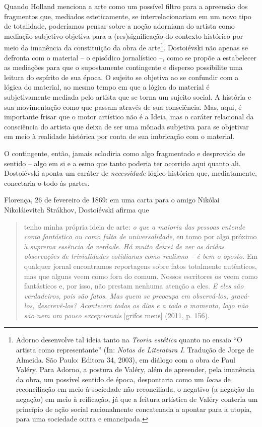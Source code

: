 Quando Holland menciona a arte como um possível filtro para a apreensão
dos fragmentos que, mediados esteticamente, se interrelacionariam em um
novo tipo de totalidade, poderíamos pensar sobre a noção adorniana do
artista como mediação subjetivo-objetiva para a (res)significação do
contexto histórico por meio da imanência da constituição da obra de
arte\footnote{Adorno desenvolve tal ideia tanto na \emph{Teoria
  estética} quanto no ensaio ``O artista como representante'' (In:
  \emph{Notas de Literatura I}. Tradução de Jorge de Almeida. São Paulo:
  Editora 34, 2003), em diálogo com a obra de Paul Valéry. Para Adorno,
  a postura de Valéry, além de apreender, pela imanência da obra, um
  possível sentido de época, despontaria como um \emph{locus} de
  reconciliação em meio à sociedade não reconciliada, o negativo (a
  negação da negação) em meio à reificação, já que a feitura artística
  de Valéry conteria um princípio de ação social racionalmente
  concatenada a apontar para a utopia, para uma sociedade outra e
  emancipada.}. Dostoiévski não apenas se defronta com o material -- o
episódico jornalístico --, como se propõe a estabelecer as mediações
para que o supostamente contingente e disperso possibilite uma leitura
do espírito de sua época. O sujeito se objetiva ao se confundir com a
lógica do material, ao mesmo tempo em que a lógica do material é
subjetivamente mediada pelo artista que se torna um sujeito social. A
história e sua movimentação como que passam através de sua consciência.
Mas, aqui, é importante frisar que o motor artístico não é a Ideia, mas
o caráter relacional da consciência do artista que deixa de ser uma
mônada subjetiva para se objetivar em meio à realidade histórica por
conta de sua imbricação com o material.

O contingente, então, jamais eclodiria como algo fragmentado e
desprovido de sentido -- algo em si e a esmo que tanto poderia ter
ocorrido aqui quanto ali. Dostoiévski aponta um caráter de
\emph{necessidade} lógico-histórica que, mediatamente, conectaria o todo
às partes.

Florença, 26 de fevereiro de 1869: em uma carta para o amigo Nikólai
Nikoláievitch Strákhov, Dostoiévski afirma que

\begin{quote}
tenho minha própria ideia de arte: \emph{o que a maioria das pessoas
entende como fantástico ou como falta de universalidade}, eu tomo por
algo próximo à \emph{suprema essência da verdade. Há muito deixei de ver
as áridas observações de trivialidades cotidianas como realismo -- é bem
o oposto.} Em qualquer jornal encontramos reportagens sobre fatos
totalmente autênticos, mas que alguns veem como fora do comum. Nossos
escritores os veem como fantásticos e, por isso, não prestam nenhuma
atenção a eles. \emph{E eles são verdadeiros, pois são fatos. Mas quem
se preocupa em observá-los, gravá-los, descrevê-los? Acontecem todos os
dias e a todo o momento, logo não são nem um pouco excepcionais}
{[}grifos meus{]} (2011, p. 156).
\end{quote}

